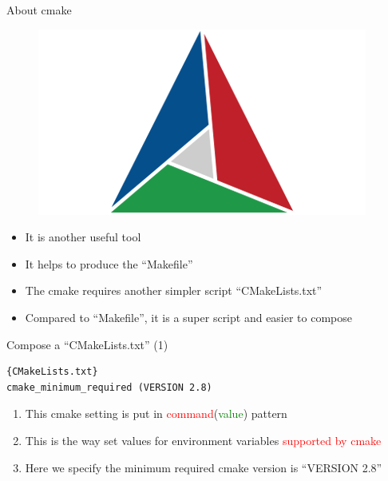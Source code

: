 \begin{frame}{About cmake}
\vspace{0.2in}
\begin{figure}
	\begin{center}
		\includegraphics[width=0.3\linewidth]{figs/cmake.png}
	\end{center}
\end{figure}
\begin{itemize}
	\item {It is another useful tool}
	\vspace{0.15in}
	\item {It helps to produce the ``Makefile''}
	\vspace{0.15in}
	\item {The cmake requires another simpler script ``CMakeLists.txt''}
	\vspace{0.15in}
	\item {Compared to ``Makefile'', it is a super script and easier to compose}
\end{itemize}
\end{frame}

\begin{frame}[fragile]{Compose a ``CMakeLists.txt'' (1)}
\begin{lstlisting}[linewidth=0.95\linewidth, firstnumber= 1, xleftmargin=0.02\linewidth]{CMakeLists.txt}
cmake_minimum_required (VERSION 2.8)
\end{lstlisting}

\begin{enumerate}
	\item {This cmake setting is put in \textcolor{red}{command}(\textcolor{green}{value}) pattern}
		\vspace{0.15in}
	\item {This is the way set values for environment variables \textcolor{red}{supported by cmake} }
		\vspace{0.15in}
	\item {Here we specify the minimum required cmake version is ``VERSION 2.8''}
\end{enumerate}
\end{frame}

